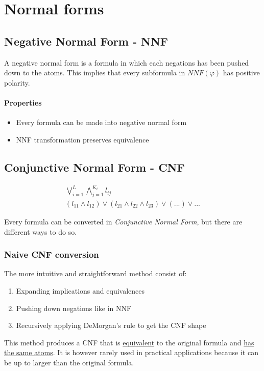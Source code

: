 \documentclass{article}
\begin{document}
\section{Normal forms}
\subsection{Negative Normal Form - NNF}
A negative normal form is a formula in which each negations has been pushed down to the atoms. This implies that every subformula in $NNF(\varphi)$ has positive polarity.

\paragraph{Properties}
\begin{itemize}
    \item Every formula can be made into negative normal form
    \item NNF transformation preserves equivalence
\end{itemize}

\subsection{Conjunctive Normal Form - CNF}
\begin{gather*}
\bigvee_{i=1}^L \bigwedge_{j=1}^{K_i} l_{ij} \\
(l_{11} \wedge l_{12})\vee(l_{21} \wedge l_{22} \wedge l_{23})\vee(...)\vee...
\end{gather*}

Every formula can be converted in \textit{Conjunctive Normal Form}, but there are different ways to do so.

\subsubsection{Naive CNF conversion}
The more intuitive and straightforward method consist of:
\begin{enumerate}
    \item Expanding implications and equivalences
    \item Pushing down negations like in NNF
    \item Recursively applying DeMorgan's rule to get the CNF shape
\end{enumerate}

This method produces a CNF that is \underline{equivalent} to the original formula and \underline{has the same atoms}. It is however rarely used in practical applications because it can be up to  larger than the original formula.
\end{document}
